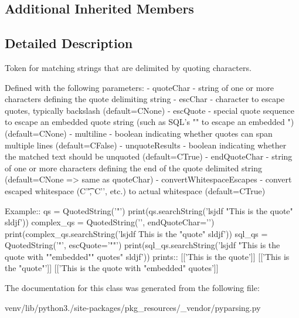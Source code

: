 \subsection*{Additional Inherited Members}


\subsection{Detailed Description}
\begin{DoxyVerb}Token for matching strings that are delimited by quoting characters.

Defined with the following parameters:
    - quoteChar - string of one or more characters defining the quote delimiting string
    - escChar - character to escape quotes, typically backslash (default=C{None})
    - escQuote - special quote sequence to escape an embedded quote string (such as SQL's "" to escape an embedded ") (default=C{None})
    - multiline - boolean indicating whether quotes can span multiple lines (default=C{False})
    - unquoteResults - boolean indicating whether the matched text should be unquoted (default=C{True})
    - endQuoteChar - string of one or more characters defining the end of the quote delimited string (default=C{None} => same as quoteChar)
    - convertWhitespaceEscapes - convert escaped whitespace (C{'\t'}, C{'\n'}, etc.) to actual whitespace (default=C{True})

Example::
    qs = QuotedString('"')
    print(qs.searchString('lsjdf "This is the quote" sldjf'))
    complex_qs = QuotedString('{{', endQuoteChar='}}')
    print(complex_qs.searchString('lsjdf {{This is the "quote"}} sldjf'))
    sql_qs = QuotedString('"', escQuote='""')
    print(sql_qs.searchString('lsjdf "This is the quote with ""embedded"" quotes" sldjf'))
prints::
    [['This is the quote']]
    [['This is the "quote"']]
    [['This is the quote with "embedded" quotes']]
\end{DoxyVerb}
 

The documentation for this class was generated from the following file\+:\begin{DoxyCompactItemize}
\item 
venv/lib/python3./site-\/packages/pkg\+\_\+resources/\+\_\+vendor/pyparsing.\+py\end{DoxyCompactItemize}
